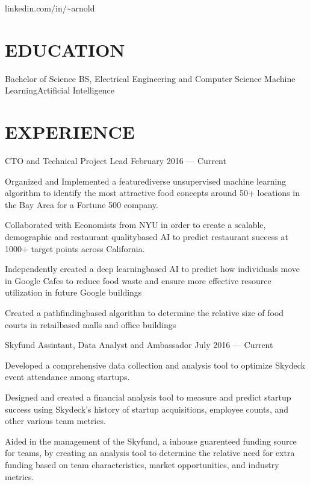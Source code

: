 \documentclass[10pt]{article}
\begin{document}
				 {linkedin.com/in/{\textasciitilde}arnold}      

\section*{EDUCATION}

        {Bachelor of Science {\textendash} BS, Electrical Engineering and Computer Science}
			{Machine Learning}{Artificial Intelligence}


\section*{EXPERIENCE}

								{CTO and Technical Project Lead}
								{February 2016 --- Current}                  		
	                   \begin{accomplishments} 
                       \item Organized and Implemented a feature{\textendash}diverse unsupervised machine learning algorithm to identify the most attractive food concepts around 50+ locations in the Bay Area for a Fortune 500 company.
                       \item Collaborated with Economists from NYU in order to create a scalable, demographic and restaurant quality{\textendash}based AI to predict restaurant success at 1000+ target points across California.
                       \item Independently created a deep learning{\textendash}based AI to predict how individuals move in Google Cafes to reduce food waste and ensure more effective resource utilization in future Google buildings
	                    		\item Created a pathfinding{\textendash}based algorithm to determine the relative size of food courts in retail{\textendash}based malls and office buildings
	                    \end{accomplishments}
	                    		
	   		
	   		\employer{Skydeck Berkeley}{Berkeley, CA}
	   			{Skyfund Assintant, Data Analyst and Ambassador}
                {July 2016 --- Current}
			  		\begin{accomplishments}
	                   		\item Developed a comprehensive data collection and analysis tool to optimize Skydeck event attendance among startups.
	                   		\item Designed and created a financial analysis tool to measure and predict startup success using Skydeck's history of startup acquisitions, employee counts, and other various team metrics.
                            \item Aided in the management of the Skyfund, a in{\textendash}house guarenteed funding source for teams, by creating an analysis tool to determine the relative need for extra funding based on team characteristics, market opportunities, and industry metrics.
	                  \end{accomplishments}
                  	 
\end{document}
